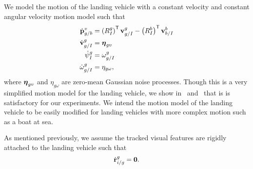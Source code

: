 We model the motion of the landing vehicle
with a constant velocity and constant
angular velocity motion model such that
\begin{align}
  \dot{\boldsymbol{\mathrm{p}}}_{g/b}^{v} &= \left( R_{I}^{g} \right)^{\mathsf{T}}
  \boldsymbol{\mathrm{v}}_{g/I}^{g} - \left( R_{I}^{b} \right)^{\mathsf{T}}
  \boldsymbol{\mathrm{v}}_{b/I}^{b} \label{eq:goal_dynamics} \\
  \dot{\boldsymbol{\mathrm{v}}}_{g/I}^{g} &= \boldsymbol{\mathrm{\eta}}_{gv} \nonumber \\
  \dot{\psi}_{I}^{g} &= \omega_{g/I}^g \nonumber \\
  \dot{\omega}_{g/I}^{g} &= \eta_{g\omega} \nonumber,
\end{align}
where $\boldsymbol{\mathrm{\eta}}_{gv}$ and $\eta_{g\omega}$ are zero-mean Gaussian noise
processes. Though this is a very simplified motion model for the landing
vehicle, we show in~ and~ that is is
satisfactory for our experiments. We intend the motion model of the landing
vehicle to be easily modified for landing vehicles with more complex motion such
as a boat at sea.

As mentioned previously, we assume the tracked visual features are rigidly
attached to the landing vehicle such that
\begin{equation}
  \dot{\boldsymbol{\mathrm{r}}}_{i/g}^g = \boldsymbol{\mathrm{0}}. \label{eq:feature_dynamics}
\end{equation}

